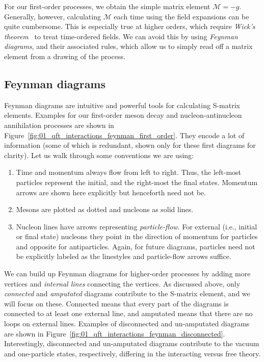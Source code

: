 For our first-order processes, we obtain the simple matrix element $\mathcal M = -g$.
Generally, however, calculating $\mathcal M$ each time using the field expansions can be quite cumbersome.
This is especially true at higher orders, which require \textit{Wick's theorem}~\cite{Wick:1950ee} to treat time-ordered fields.
We can avoid this by using \textit{Feynman diagrams}, and their associated rules, which allow us to simply read off a matrix element from a drawing of the process.



\subsection{Feynman diagrams}
\label{sec:01_qft_interactions_feynman}

Feynman diagrams are intuitive and powerful tools for calculating S-matrix elements. 
Examples for our first-order meson decay and nucleon-antinucleon annihilation processes are shown in Figure~\ref{fig:01_qft_interactions_feynman_first_order}.
They encode a lot of information (some of which is redundant, shown only for these first diagrams for clarity).
Let us walk through some conventions we are using:
\begin{enumerate}
	\item Time and momentum always flow from left to right. 
	Thus, the left-most particles represent the initial, and the right-most the final states.
	Momentum arrows are shown here explicitly but henceforth need not be.
	\item Mesons are plotted as dotted and nucleons as solid lines.
	\item Nucleon lines have arrows representing \textit{particle-flow}.
	For external (i.e., initial or final state) nucleons they point in the direction of momentum for particles and opposite for antiparticles. 
	Again, for future diagrams, particles need not be explicitly labeled as the linestyles and particle-flow arrows suffice.
\end{enumerate}



We can build up Feynman diagrams for higher-order processes by adding more vertices and \textit{internal lines} connecting the vertices.
As discussed above, only \textit{connected} and \textit{amputated} diagrams contribute to the S-matrix element, and we will focus on these.
Connected means that every part of the diagrams is connected to at least one external line, and amputated means that there are no loops on external lines.
Examples of disconnected and un-amputated diagrams are shown in Figure~\ref{fig:01_qft_interactions_feynman_disconnected}.
Interestingly, disconnected and un-amputated diagrams contribute to the vacuum and one-particle states, respectively, differing in the interacting versus free theory.

